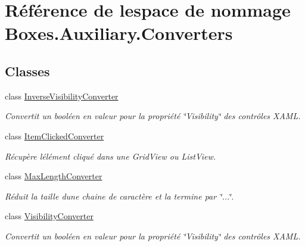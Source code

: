 \hypertarget{namespace_boxes_1_1_auxiliary_1_1_converters}{}\section{Référence de l\textquotesingle{}espace de nommage Boxes.\+Auxiliary.\+Converters}
\label{namespace_boxes_1_1_auxiliary_1_1_converters}
\subsection*{Classes}
\begin{DoxyCompactItemize}
\item 
class \hyperlink{class_boxes_1_1_auxiliary_1_1_converters_1_1_inverse_visibility_converter}{Inverse\+Visibility\+Converter}
\begin{DoxyCompactList}\small\item\em Convertit un booléen en valeur pour la propriété \char`\"{}\+Visibility\char`\"{} des contrôles X\+A\+ML. \end{DoxyCompactList}\item 
class \hyperlink{class_boxes_1_1_auxiliary_1_1_converters_1_1_item_clicked_converter}{Item\+Clicked\+Converter}
\begin{DoxyCompactList}\small\item\em Récupère l\textquotesingle{}élément cliqué dans une Grid\+View ou List\+View. \end{DoxyCompactList}\item 
class \hyperlink{class_boxes_1_1_auxiliary_1_1_converters_1_1_max_length_converter}{Max\+Length\+Converter}
\begin{DoxyCompactList}\small\item\em Réduit la taille d\textquotesingle{}une chaine de caractère et la termine par \char`\"{}...\char`\"{}. \end{DoxyCompactList}\item 
class \hyperlink{class_boxes_1_1_auxiliary_1_1_converters_1_1_visibility_converter}{Visibility\+Converter}
\begin{DoxyCompactList}\small\item\em Convertit un booléen en valeur pour la propriété \char`\"{}\+Visibility\char`\"{} des contrôles X\+A\+ML. \end{DoxyCompactList}\end{DoxyCompactItemize}
